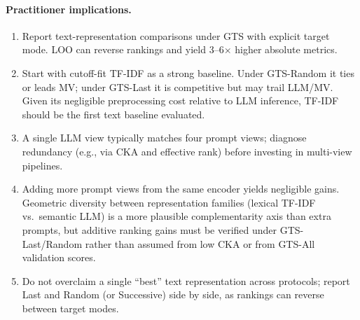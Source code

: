 \documentclass[sigconf,natbib=true,anonymous]{acmart}
\newcommand{\tfidf}{\textsc{TF-IDF}\xspace}
\newcommand{\llm}{\textsc{LLM}\xspace}
\begin{document}
\paragraph{Practitioner implications.}
\begin{enumerate}[leftmargin=*,itemsep=2pt]
\item Report text-representation comparisons under GTS with explicit target mode.  LOO can reverse rankings and yield 3--6$\times$ higher absolute metrics.
\item Start with cutoff-fit \tfidf as a strong baseline.  Under GTS-Random it ties or leads MV; under GTS-Last it is competitive but may trail LLM/MV.  Given its negligible preprocessing cost relative to LLM inference, TF-IDF should be the first text baseline evaluated.
\item A single \llm view typically matches four prompt views; diagnose redundancy (e.g., via CKA and effective rank) before investing in multi-view pipelines.
\item Adding more prompt views from the same encoder yields negligible gains.  Geometric diversity between representation families (lexical \tfidf vs.\ semantic \llm) is a more plausible complementarity axis than extra prompts, but additive ranking gains must be verified under GTS-Last/Random rather than assumed from low CKA or from GTS-All validation scores.
\item Do not overclaim a single ``best'' text representation across protocols; report Last and Random (or Successive) side by side, as rankings can reverse between target modes.
\end{enumerate}
\end{document}
